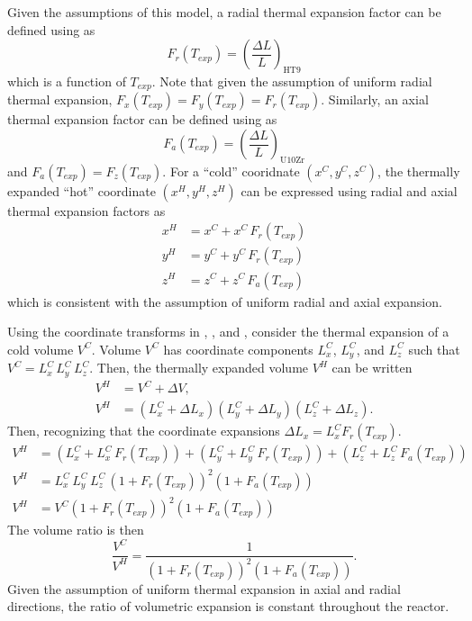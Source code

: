   Given the assumptions of this model, a radial thermal expansion factor can be
  defined using  as
  \begin{equation}
    \label{eq:lef_r}
    F_r(T_{exp}) = \left(\frac{\Delta L}{L}\right)_{\text{HT9}}
  \end{equation}
  which is a function of $T_{exp}$. Note that given the assumption of uniform
  radial thermal expansion, ${F_x(T_{exp}) = F_y(T_{exp}) = F_r(T_{exp})}$.
  Similarly, an axial thermal expansion factor can be defined using
   as 
  \begin{equation}
    \label{eq:lef_a}
    F_a(T_{exp}) = \left(\frac{\Delta L}{L}\right)_{\text{U10Zr}}
  \end{equation}
  and $F_a(T_{exp}) = F_z(T_{exp})$. For a ``cold'' cooridnate $(x^C,y^C,z^C)$,
  the thermally expanded ``hot'' coordinate $(x^H,y^H,z^H)$ can be expressed 
  using radial and axial thermal expansion factors as
  \begin{align}
    \label{eq:expand_x}
    x^H &= x^C + x^C \, F_r(T_{exp}) \\
    \label{eq:expand_y}
    y^H &= y^C + y^C \, F_r(T_{exp}) \\
    \label{eq:expand_z}
    z^H &= z^C + z^C \, F_a(T_{exp})
  \end{align}
  which is consistent with the assumption of uniform radial and axial expansion.

  Using the coordinate transforms in , , and
  , consider the thermal expansion of a cold volume $V^C$.
  Volume $V^C$ has coordinate components $L_x^C$, $L_y^C$, and $L_z^C$ such that 
  ${V^C = L_x^C \, L_y^C \, L_z^C}$. Then, the thermally expanded volume $V^H$ 
  can be written
  \begin{align}
    V^H &= V^C + \Delta V, \\
    V^H &= (L_x^C + \Delta L_x) (L_y^C + \Delta L_y) (L_z^C + \Delta L_z). 
  \end{align}
  Then, recognizing that the coordinate expansions 
  ${\Delta L_x = L_x^C F_r(T_{exp})}$.
  \begin{align}
    V^H &= (L_x^C + L_x^C \, F_r(T_{exp})) + (L_y^C + L_y^C \, F_r(T_{exp})) + 
      (L_z^C + L_z^C \, F_a(T_{exp})) \\
    V^H &= L_x^C \, L_y^C \, L_z^C \, (1 + F_r(T_{exp}))^2 (1+F_a(T_{exp})) \\
    V^H &= V^C (1 + F_r(T_{exp}))^2 (1+F_a(T_{exp}))
  \end{align}
  The volume ratio is then
  \begin{equation}
    \label{eq:volume_ratio}
    \frac{V^C}{V^H} = \frac{1}{(1+F_r(T_{exp}))^2 (1+F_a(T_{exp}))}.
  \end{equation}
  Given the assumption of uniform thermal expansion in axial and radial
  directions, the ratio of volumetric expansion is constant throughout the
  reactor.

